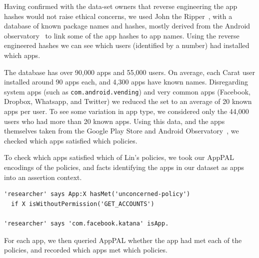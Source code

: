 \documentclass[thesis.tex]{subfiles}
\begin{document}
Having confirmed with the data-set owners that reverse engineering the app
hashes would not raise ethical concerns, we used John the
Ripper~\cite{solar_designer_john_2013}, with a database of known package names
and hashes, mostly derived from the Android
observatory~\cite{barrera_understanding_2012} to link some of the app hashes to
app names.  Using the reverse engineered hashes we can see which users
(identified by a number) had installed which apps.

The database has over 90,000 apps and 55,000 users.  On average, each
Carat user installed around 90 apps each, and 4,300 apps have known names.
Disregarding system apps (such as \texttt{com.android.vending}) and
very common apps (Facebook, Dropbox, Whatsapp, and Twitter) we reduced
the set to an average of 20 known apps per user.  To see some
variation in app type, we considered only the 44,000 users who had
more than 20 known apps.  Using this data, and the apps themselves
taken from the Google Play Store and Android
Observatory~\cite{barrera_understanding_2012}, we checked which apps
satisfied which policies.  

To check which apps satisfied which of Lin's policies, we took our AppPAL encodings of the policies, and facts identifying the apps in our dataset as apps into an assertion context.  

\begin{lstlisting}
'researcher' says App:X hasMet('unconcerned-policy')
  if X isWithoutPermission('GET_ACCOUNTS')

'researcher' says 'com.facebook.katana' isApp.
\end{lstlisting}

For each app, we then queried AppPAL whether the app had met each of the policies, and
recorded which apps met which policies. 
\end{document}
